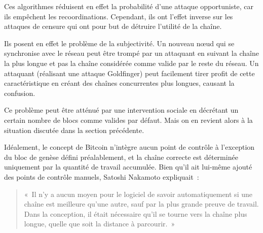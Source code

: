 Ces algorithmes réduisent en effet la probabilité d'une attaque opportuniste, car ils empêchent les recoordinations. Cependant, ils ont l'effet inverse sur les attaques de censure qui ont pour but de détruire l'utilité de la chaîne.

Ils posent en effet le problème de la subjectivité. Un nouveau nœud qui se synchronise avec le réseau peut être trompé par un attaquant en suivant la chaîne la plus longue et pas la chaîne considérée comme valide par le reste du réseau. Un attaquant (réalisant une attaque Goldfinger) peut facilement tirer profit de cette caractéristique en créant des chaînes concurrentes plus longues, causant la confusion.

Ce problème peut être atténué par une intervention sociale en décrétant un certain nombre de blocs comme valides par défaut. Mais on en revient alors à la situation discutée dans la section précédente.

Idéalement, le concept de Bitcoin n'intègre aucun point de contrôle à l'exception du bloc de genèse défini préalablement, et la chaîne correcte est déterminée uniquement par la quantité de travail accumulée. Bien qu'il ait lui-même ajouté des points de contrôle manuels, Satoshi Nakamoto expliquait~:

\begin{quote}
«~Il n'y a aucun moyen pour le logiciel de savoir automatiquement si une chaîne est meilleure qu'une autre, sauf par la plus grande preuve de travail. Dans la conception, il était nécessaire qu'il se tourne vers la chaîne plus longue, quelle que soit la distance à parcourir.~»
\end{quote}

%

